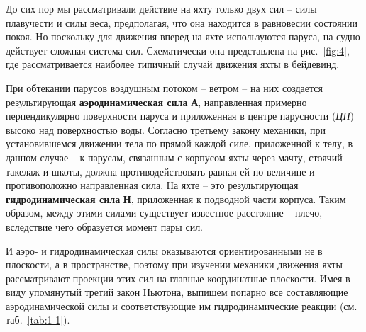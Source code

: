 \documentclass[a4paper, 12pt, twoside, final, book, russian, fittopage, cyremdash]{ncc}
\newcommand{\ris}[1]{\ref{fig:#1}}
\begin{document}
До сих пор мы рассматривали действие на яхту только двух сил \--- силы плавучести и силы веса, предполагая, что она находится в равновесии состоянии покоя. Но поскольку для движения вперед на яхте используются паруса, на судно действует сложная система сил. Схематически она представлена на рис.~\ris{4}, где рассматривается наиболее типичный случай движения яхты в бейдевинд.

При обтекании парусов воздушным потоком \--- ветром \--- на них создается результирующая \textbf{аэродинамическая сила} \textbf{А}, направленная примерно перпендикулярно поверхности паруса и приложенная в центре парусности (\textit{ЦП}) высоко над поверхностью воды. Согласно третьему закону механики, при установившемся движении тела по прямой каждой силе, приложенной к телу, в данном случае \--- к парусам, связанным с корпусом яхты через мачту, стоячий такелаж и шкоты, должна противодействовать равная ей по величине и противоположно направленная сила. На яхте \--- это результирующая \textbf{гидродинамическая сила} \textbf{Н}, приложенная к подводной части корпуса. Таким образом, между этими силами существует известное расстояние \--- плечо, вследствие чего образуется момент пары сил.

И аэро- и гидродинамическая силы оказываются ориентированными не в плоскости, а в пространстве, поэтому при изучении механики движения яхты рассматривают проекции этих сил на главные координатные плоскости. Имея в виду упомянутый третий закон Ньютона, выпишем попарно все составляющие аэродинамической силы и соответствующие им гидродинамические реакции (см. таб.~\ref{tab:1-1}).
\end{document}
